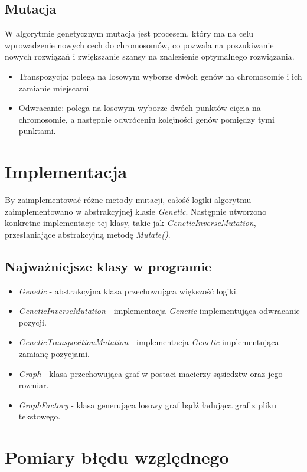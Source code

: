 \documentclass{article}
\begin{document}
\subsection{Mutacja}
W algorytmie genetycznym mutacja jest procesem, który ma na celu wprowadzenie nowych cech do chromosomów, co pozwala na poszukiwanie nowych rozwiązań i zwiększanie szansy na znalezienie optymalnego rozwiązania.
\begin{itemize}
    \item Transpozycja: polega na losowym wyborze dwóch genów na chromosomie i ich zamianie miejscami
    \item Odwracanie: polega na losowym wyborze dwóch punktów cięcia na chromosomie, a następnie odwróceniu kolejności genów pomiędzy tymi punktami.
\end{itemize}

\newpage
\section{Implementacja}

By zaimplementować różne metody mutacji, całość logiki algorytmu zaimplementowano w abstrakcyjnej klasie \textit{Genetic}. Następnie utworzono konkretne implementacje tej klasy, takie jak \textit{GeneticInverseMutation}, przesłaniające abstrakcyjną metodę \textit{Mutate()}.


\subsection{Najważniejsze klasy w programie}
\begin{itemize}
    \item \textit{Genetic} - abstrakcyjna klasa przechowująca większość logiki.
    \item \textit{GeneticInverseMutation} - implementacja \textit{Genetic} implementująca odwracanie pozycji.
    \item \textit{GeneticTranspositionMutation} - implementacja \textit{Genetic} implementująca zamianę pozycjami.
    \item \textit{Graph} - klasa przechowująca graf w postaci macierzy sąsiedztw oraz jego rozmiar.
    \item \textit{GraphFactory} - klasa generująca losowy graf bądź ładująca graf z pliku tekstowego.
\end{itemize}

\section{Pomiary błędu względnego}
\end{document}
